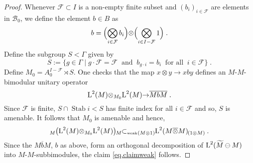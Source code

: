 \documentclass[a4paper,11pt]{amsart}
\numberwithin{equation}{section}
\begin{document}
\begin{proof}
Whenever ${\mathcal{F}} \subset I$ is a non-empty finite subset and $(b_i)_{i \in {\mathcal{F}}}$ are elements in ${\mathcal{B}}_0$, we define the element $b \in B$ as
\begin{equation}\label{eq.formb}
b = \Bigl( \bigotimes_{i \in {\mathcal{F}}} b_i \Bigr) {\otimes} \Bigl(\bigotimes_{i \in I - {\mathcal{F}}} 1 \Bigr) \; .
\end{equation}
Define the subgroup $S < \Gamma$ given by
$$S := \{g \in \Gamma \mid g \cdot {\mathcal{F}} = {\mathcal{F}} \;\;\text{and}\;\; b_{g \cdot i} = b_i \;\;\text{for all}\;\; i \in {\mathcal{F}} \} \; .$$
Define $M_0 = A_0^{I - {\mathcal{F}}} \rtimes S$. One checks that the map $x {\otimes} y {\rightarrow} x b y$ defines an $M$-$M$-bimodular unitary operator
$${\mathord{\text{\rm L}}}^2(M) {\otimes}_{M_0} {\mathord{\text{\rm L}}}^2(M) {\rightarrow} \overline{M b M} \; .$$
Since ${\mathcal{F}}$ is finite, $S \cap {\operatorname{Stab}} i < S$ has finite index for all $i \in {\mathcal{F}}$ and so, $S$ is amenable. It follows that $M_0$ is amenable and hence,
$${\mathord{\raisebox{-0.4ex}[0ex][0ex]{\scriptsize ${M}$}{{\bigl({\mathord{\text{\rm L}}}^2(M) {\otimes}_{M_0} {\mathord{\text{\rm L}}}^2(M)\bigr)}}\hspace{-0.2ex}\raisebox{-0.4ex}[0ex][0ex]{\scriptsize ${M}$}}} {\subset_{\text{\rm\tiny weak}}} {\mathord{\raisebox{-0.4ex}[0ex][0ex]{\scriptsize ${(M {\otimes} 1)}$}{{{\mathord{\text{\rm L}}}^2(M {\mathbin{\overline{\otimes}}} M)}}\hspace{-0.2ex}\raisebox{-0.4ex}[0ex][0ex]{\scriptsize ${(1 {\otimes} M)}$}}} \; .$$
Since the $\overline{M b M}$, $b$ as above, form an orthogonal decomposition of ${\mathord{\text{\rm L}}}^2({\widetilde{M}} \ominus M)$ into $M$-$M$-sub\-bi\-modules, the claim \eqref{eq.claimweak} follows.


\end{proof}
\end{document}
